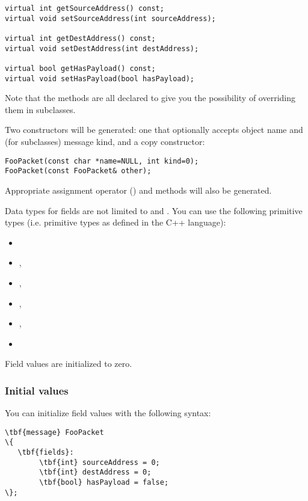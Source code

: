 \begin{verbatim}
virtual int getSourceAddress() const;
virtual void setSourceAddress(int sourceAddress);

virtual int getDestAddress() const;
virtual void setDestAddress(int destAddress);

virtual bool getHasPayload() const;
virtual void setHasPayload(bool hasPayload);
\end{verbatim}

Note that the methods are all declared  to give you the possibility
of overriding them in subclasses.

Two constructors will be generated: one that optionally accepts object name and
(for  subclasses) message kind, and a copy constructor:

\begin{verbatim}
FooPacket(const char *name=NULL, int kind=0);
FooPacket(const FooPacket& other);
\end{verbatim}

Appropriate assignment operator () and  methods will
also be generated.

Data types for fields are not limited to  and . You can use the
following primitive types (i.e. primitive types as defined in the C++ language):

\begin{itemize}
   \item {}
   \item {}, 
   \item {}, 
   \item {}, 
   \item {}, 
   \item {}
\end{itemize}

Field values are initialized to zero.


\subsubsection{Initial values}

You can initialize field values with the following syntax:

\begin{Verbatim}[commandchars=\\\{\}]
\tbf{message} FooPacket
\{
   \tbf{fields}:
        \tbf{int} sourceAddress = 0;
        \tbf{int} destAddress = 0;
        \tbf{bool} hasPayload = false;
\};
\end{Verbatim}

